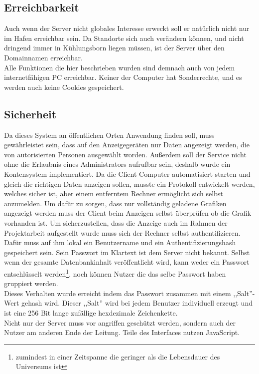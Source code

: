 \subsection{Erreichbarkeit} %
Auch wenn der Server nicht globales Interesse erweckt soll er natürlich nicht nur im Hafen erreichbar sein.
Da Standorte sich auch verändern können,
und nicht dringend immer in Kühlungsborn liegen müssen, ist der Server über den Domainnamen  erreichbar. \\
Alle Funktionen die hier beschrieben wurden sind demnach auch von jedem internetfähigen PC erreichbar. Keiner der Computer hat Sonderrechte,
und es werden auch keine Cookies gespeichert.

\subsection{Sicherheit} %
Da dieses System an öffentlichen Orten Anwendung finden soll,
muss gewährleistet sein, dass auf den Anzeigegeräten nur Daten angezeigt werden,
die von autorisierten Personen ausgewählt worden.
Außerdem soll der Service nicht ohne die Erlaubnis eines Administrators aufrufbar sein,
deshalb wurde ein Kontensystem implementiert.
Da die Client Computer automatisiert starten und gleich die richtigen Daten anzeigen sollen,
musste ein Protokoll entwickelt werden, welches sicher ist,
aber einem entferntem Rechner ermöglicht sich selbst anzumelden.
Um dafür zu sorgen, dass nur vollständig geladene Grafiken angezeigt werden muss
der Client beim Anzeigen selbst überprüfen ob die Grafik vorhanden ist.
Um sicherzustellen, dass die Anzeige auch im Rahmen der Projektarbeit aufgestellt
wurde muss sich der Rechner selbst authentifizieren.
Dafür muss auf ihm lokal ein Benutzername und ein
Authentifizierungshash gespeichert sein. Sein Passwort im Klartext ist dem Server nicht bekannt.
Selbst wenn der gesamte Datenbankinhalt veröffentlicht wird, kann weder ein Passwort
entschlüsselt werden\footnote{zumindest in einer Zeitspanne die
geringer als die Lebensdauer des Universums ist}, noch können Nutzer die das selbe Passwort haben
gruppiert werden.\\
Dieses Verhalten wurde erreicht indem das Passwort zusammen mit einem ,,Salt''-Wert gehash wird.
Dieser ,,Salt'' wird bei jedem Benutzer individuell
erzeugt und ist eine 256 Bit lange zufällige hexdezimale Zeichenkette.\\
Nicht nur der Server muss vor angriffen geschützt werden, sondern auch der
Nutzer am anderen Ende der Leitung.
Teile des Interfaces nutzen JavaScript.
